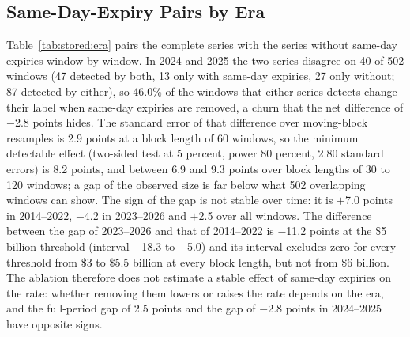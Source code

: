 \subsection{Same-Day-Expiry Pairs by Era}
\label{sup:stored:e9}

Table~\ref{tab:stored:era} pairs the complete series with the series without same-day expiries window by window. In 2024 and 2025 the two series disagree on 40 of 502 windows (47 detected by both, 13 only with same-day expiries, 27 only without; 87 detected by either), so 46.0\% of the windows that either series detects change their label when same-day expiries are removed, a churn that the net difference of $-$2.8 points hides. The standard error of that difference over moving-block resamples is 2.9 points at a block length of 60 windows, so the minimum detectable effect (two-sided test at 5 percent, power 80 percent, 2.80 standard errors) is 8.2 points, and between 6.9 and 9.3 points over block lengths of 30 to 120 windows; a gap of the observed size is far below what 502 overlapping windows can show. The sign of the gap is not stable over time: it is $+$7.0 points in 2014--2022, $-$4.2 in 2023--2026 and $+$2.5 over all windows. The difference between the gap of 2023--2026 and that of 2014--2022 is $-$11.2 points at the \$5 billion threshold (interval $-$18.3 to $-$5.0) and its interval excludes zero for every threshold from \$3 to \$5.5 billion at every block length, but not from \$6 billion. The ablation therefore does not estimate a stable effect of same-day expiries on the rate: whether removing them lowers or raises the rate depends on the era, and the full-period gap of 2.5 points and the gap of $-$2.8 points in 2024--2025 have opposite signs.

